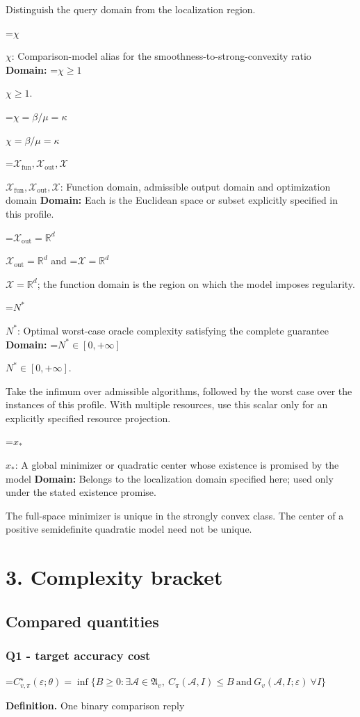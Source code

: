 \documentclass[10pt,a4paper]{article}
\newcommand{\AtlasMath}[1]{\par\begingroup\centering\setbox0=\hbox{$\displaystyle #1$}\ifdim\wd0>1.4\linewidth\typeout{ATLAS WIDE FORMULA: \the\wd0}\fi\ifdim\wd0>\linewidth\resizebox{\linewidth}{!}{\box0}\else\box0\fi\par\endgroup}
\newcommand{\AtlasInlineMath}[1]{\begingroup\setbox0=\hbox{$#1$}\ifdim\wd0>.4\linewidth\endgroup\AtlasMath{#1}\else\endgroup$#1$\fi}
\begin{document}
Distinguish the query domain from the localization region.

\AtlasInlineMath{\chi}: Comparison-model alias for the smoothness-to-strong-convexity ratio \textbf{Domain:} \AtlasInlineMath{\chi\ge1}.

\AtlasInlineMath{\chi=\beta/\mu=\kappa}

\AtlasInlineMath{\mathcal{X}_{\mathrm{fun}},\mathcal{X}_{\mathrm{out}},\mathcal{X}}: Function domain, admissible output domain and optimization domain \textbf{Domain:} Each is the Euclidean space or subset explicitly specified in this profile.

\AtlasInlineMath{\mathcal{X}_{\mathrm{out}}=\mathbb{R}^d} and \AtlasInlineMath{\mathcal{X}=\mathbb{R}^d}; the function domain is the region on which the model imposes regularity.

\AtlasInlineMath{N^*}: Optimal worst-case oracle complexity satisfying the complete guarantee \textbf{Domain:} \AtlasInlineMath{N^*\in[0,+\infty]}.

Take the infimum over admissible algorithms, followed by the worst case over the instances of this profile. With multiple resources, use this scalar only for an explicitly specified resource projection.

\AtlasInlineMath{x_*}: A global minimizer or quadratic center whose existence is promised by the model \textbf{Domain:} Belongs to the localization domain specified here; used only under the stated existence promise.

The full-space minimizer is unique in the strongly convex class. The center of a positive semidefinite quadratic model need not be unique.

\section{3. Complexity bracket}
\subsection{Compared quantities}
\subsubsection{Q1 - target accuracy cost}
\AtlasMath{C^\star_{v,\pi}(\varepsilon;\theta)=\inf\{B\ge0:\exists\mathcal A\in\mathfrak A_v,\ C_\pi(\mathcal A,I)\le B\ \text{and}\ G_v(\mathcal A,I;\varepsilon)\ \forall I\}}
\textbf{Definition.} One binary comparison reply
\end{document}
